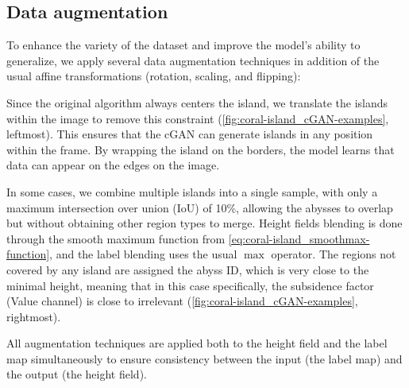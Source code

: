 
\subsection{Data augmentation}
\label{sec:coral-island_data-augmentation}


To enhance the variety of the dataset and improve the model's ability to generalize, we apply several data augmentation techniques in addition of the usual affine transformations (rotation, scaling, and flipping):
\begin{Itemize}
         Since the original algorithm always centers the island, we translate the islands within the image to remove this constraint (\cref{fig:coral-island_cGAN-examples}, leftmost). This ensures that the cGAN can generate islands in any position within the frame. By wrapping the island on the borders, the model learns that data can appear on the edges on the image.


         In some cases, we combine multiple islands into a single sample, with only a maximum intersection over union (IoU) of 10\%, allowing the abysses to overlap but without obtaining other region types to merge. Height fields blending is done through the smooth maximum function from \cref{eq:coral-island_smoothmax-function}, and the label blending uses the usual $\max$ operator. The regions not covered by any island are assigned the abyss ID, which is very close to the minimal height, meaning that in this case specifically, the subsidence factor (Value channel) is close to irrelevant (\cref{fig:coral-island_cGAN-examples}, rightmost). 
\end{Itemize}

All augmentation techniques are applied both to the height field and the label map simultaneously to ensure consistency between the input (the label map) and the output (the height field).